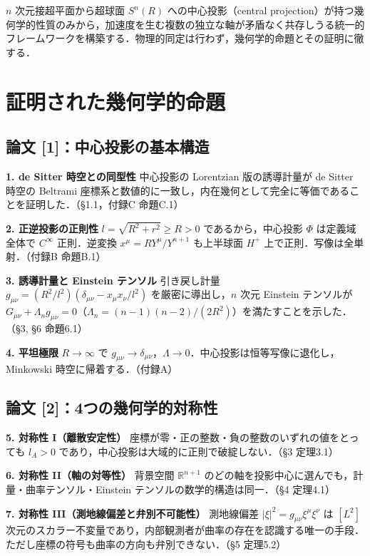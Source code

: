 \documentclass[12pt,a4paper]{ltjsarticle}
\begin{document}
$n$ 次元接超平面から超球面 $S^n(R)$ への中心投影（central projection）が持つ幾何学的性質のみから，加速度を生む複数の独立な軸が矛盾なく共存しうる統一的フレームワークを構築する．物理的同定は行わず，幾何学的命題とその証明に徹する．

\section*{証明された幾何学的命題}

\subsection*{論文 [1]：中心投影の基本構造}

\textbf{1. de Sitter 時空との同型性}\quad
中心投影の Lorentzian 版の誘導計量が de Sitter 時空の Beltrami 座標系と数値的に一致し，内在幾何として完全に等価であることを証明した．（\S 1.1，付録C 命題C.1）

\textbf{2. 正逆投影の正則性}\quad
$l = \sqrt{R^2 + r^2} \geq R > 0$ であるから，中心投影 $\Phi$ は定義域全体で $C^\infty$ 正則．逆変換 $x^\mu = RY^\mu/Y^{n+1}$ も上半球面 $H^+$ 上で正則．写像は全単射．（付録B 命題B.1）

\textbf{3. 誘導計量と Einstein テンソル}\quad
引き戻し計量 $g_{\mu\nu} = (R^2/l^2)(\delta_{\mu\nu} - x_\mu x_\nu/l^2)$ を厳密に導出し，$n$ 次元 Einstein テンソルが $G_{\mu\nu} + \Lambda_n g_{\mu\nu} = 0$（$\Lambda_n = (n{-}1)(n{-}2)/(2R^2)$）を満たすことを示した．（\S 3, \S 6 命題6.1）

\textbf{4. 平坦極限}\quad
$R \to \infty$ で $g_{\mu\nu} \to \delta_{\mu\nu}$，$\Lambda \to 0$．中心投影は恒等写像に退化し，Minkowski 時空に帰着する．（付録A）

\subsection*{論文 [2]：4つの幾何学的対称性}

\textbf{5. 対称性 I（離散安定性）}\quad
座標が零・正の整数・負の整数のいずれの値をとっても $l_A > 0$ であり，中心投影は大域的に正則で破綻しない．（\S 3 定理3.1）

\textbf{6. 対称性 II（軸の対等性）}\quad
背景空間 $\mathbb{R}^{n+1}$ のどの軸を投影中心に選んでも，計量・曲率テンソル・Einstein テンソルの数学的構造は同一．（\S 4 定理4.1）

\textbf{7. 対称性 III（測地線偏差と弁別不可能性）}\quad
測地線偏差 $|\xi|^2 = g_{\mu\nu}\xi^\mu\xi^\nu$ は $[L^2]$ 次元のスカラー不変量であり，内部観測者が曲率の存在を認識する唯一の手段．ただし座標の符号も曲率の方向も弁別できない．（\S 5 定理5.2）
\end{document}
